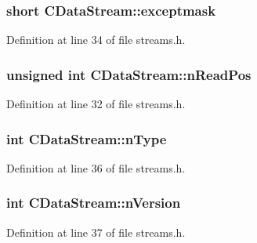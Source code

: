 \subsubsection[{exceptmask}]{\setlength{\rightskip}{0pt plus 5cm}short C\+Data\+Stream\+::exceptmask\hspace{0.3cm}{\ttfamily [protected]}}\label{class_c_data_stream_a81a6caf76267890a0f602185deb028d4}


Definition at line 34 of file streams.\+h.

\hypertarget{class_c_data_stream_af1c6a23b6725406d8f3464036a595556}{}
\subsubsection[{n\+Read\+Pos}]{\setlength{\rightskip}{0pt plus 5cm}unsigned int C\+Data\+Stream\+::n\+Read\+Pos\hspace{0.3cm}{\ttfamily [protected]}}\label{class_c_data_stream_af1c6a23b6725406d8f3464036a595556}


Definition at line 32 of file streams.\+h.

\hypertarget{class_c_data_stream_a2b646679e24cf6f382fe8ab2d4f50f35}{}
\subsubsection[{n\+Type}]{\setlength{\rightskip}{0pt plus 5cm}int C\+Data\+Stream\+::n\+Type}\label{class_c_data_stream_a2b646679e24cf6f382fe8ab2d4f50f35}


Definition at line 36 of file streams.\+h.

\hypertarget{class_c_data_stream_a074998c6b7c8aa17a1a90dbc414b605d}{}
\subsubsection[{n\+Version}]{\setlength{\rightskip}{0pt plus 5cm}int C\+Data\+Stream\+::n\+Version}\label{class_c_data_stream_a074998c6b7c8aa17a1a90dbc414b605d}


Definition at line 37 of file streams.\+h.

\hypertarget{class_c_data_stream_a45d5d8e33a27a84f26038b898adf3d43}{}
